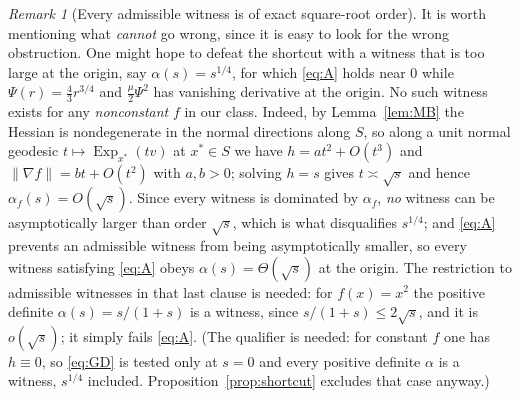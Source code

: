 \documentclass[11pt]{article}
\theoremstyle{plain}
\theoremstyle{definition}
\theoremstyle{remark}
\newtheorem{rem}[thm]{Remark}
\newcommand{\Exp}{\operatorname{Exp}}
\begin{document}
\begin{rem}[Every admissible witness is of exact square-root order]\label{rem:sqrtorder}
It is worth mentioning what \emph{cannot} go wrong, since it is easy to look for the
wrong obstruction. One might hope to defeat the shortcut with a witness that is too
large at the origin, say $\alpha(s)=s^{1/4}$, for which \eqref{eq:A} holds near $0$
while $\Psi(r)=\tfrac43r^{3/4}$ and $\tfrac\mu2\Psi^2$ has vanishing derivative at
the origin. No such witness exists for any \emph{nonconstant} $f$ in our class.
Indeed, by
Lemma~\ref{lem:MB} the Hessian is nondegenerate in the normal directions along
$S$, so along a unit normal geodesic $t\mapsto\Exp_{x^*}(tv)$ at $x^*\in S$ we have
$h = at^2+O(t^3)$ and $\|\nabla f\| = bt+O(t^2)$ with $a,b>0$; solving $h=s$ gives
$t\asymp\sqrt s$ and hence $\alpha_f(s) = O(\sqrt s)$. Since every witness is dominated by
$\alpha_f$, \emph{no} witness can be asymptotically larger than order $\sqrt s$, which
is what disqualifies $s^{1/4}$; and \eqref{eq:A} prevents an admissible witness from
being asymptotically smaller, so every witness satisfying \eqref{eq:A} obeys
$\alpha(s)=\Theta(\sqrt s)$ at the origin. The restriction to admissible witnesses in
that last clause is needed: for $f(x)=x^2$ the positive definite $\alpha(s)=s/(1+s)$
is a witness, since $s/(1+s)\le2\sqrt s$, and it is $o(\sqrt s)$; it simply fails
\eqref{eq:A}. (The qualifier is needed: for constant $f$
one has $h\equiv0$, so \eqref{eq:GD} is tested only at $s=0$ and every positive
definite $\alpha$ is a witness, $s^{1/4}$ included. Proposition~\ref{prop:shortcut}
excludes that case anyway.)


\end{rem}
\end{document}
